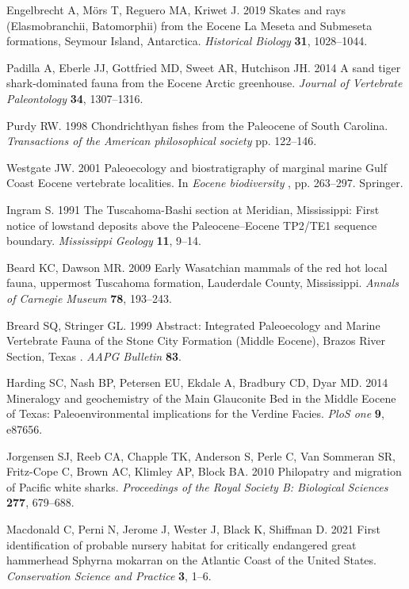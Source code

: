 \documentclass[]{rsos}%
\begin{document}
\begin{thebibliography}{99}
Engelbrecht A, M{\"{o}}rs T, Reguero MA, Kriwet J. 2019  {Skates and rays
  (Elasmobranchii, Batomorphii) from the Eocene La Meseta and Submeseta
  formations, Seymour Island, Antarctica}. {\em Historical Biology}
  \textbf{31}, 1028--1044.

Padilla A, Eberle JJ, Gottfried MD, Sweet AR, Hutchison JH. 2014  {A sand tiger
  shark-dominated fauna from the Eocene Arctic greenhouse}. {\em Journal of
  Vertebrate Paleontology} \textbf{34}, 1307--1316.

Purdy RW. 1998  Chondrichthyan fishes from the Paleocene of South Carolina.
  {\em Transactions of the American philosophical society} pp. 122--146.

Westgate JW. 2001  Paleoecology and biostratigraphy of marginal marine Gulf
  Coast Eocene vertebrate localities. In {\em Eocene biodiversity} ,  pp.
  263--297. Springer.

Ingram S. 1991  The Tuscahoma-Bashi section at Meridian, Mississippi: First
  notice of lowstand deposits above the Paleocene--Eocene TP2/TE1 sequence
  boundary. {\em Mississippi Geology} \textbf{11}, 9--14.

Beard KC, Dawson MR. 2009  Early Wasatchian mammals of the red hot local fauna,
  uppermost Tuscahoma formation, Lauderdale County, Mississippi. {\em Annals of
  Carnegie Museum} \textbf{78}, 193--243.

Breard SQ, Stringer GL. 1999  {Abstract: Integrated Paleoecology and Marine
  Vertebrate Fauna of the Stone City Formation (Middle Eocene), Brazos River
  Section, Texas }. {\em AAPG Bulletin} \textbf{83}.

Harding SC, Nash BP, Petersen EU, Ekdale A, Bradbury CD, Dyar MD. 2014
  Mineralogy and geochemistry of the Main Glauconite Bed in the Middle Eocene
  of Texas: Paleoenvironmental implications for the Verdine Facies. {\em PloS
  one} \textbf{9}, e87656.

Jorgensen SJ, Reeb CA, Chapple TK, Anderson S, Perle C, {Van Sommeran} SR,
  Fritz-Cope C, Brown AC, Klimley AP, Block BA. 2010  {Philopatry and migration
  of Pacific white sharks}. {\em Proceedings of the Royal Society B: Biological
  Sciences} \textbf{277}, 679--688.

Macdonald C, Perni N, Jerome J, Wester J, Black K, Shiffman D. 2021  {First
  identification of probable nursery habitat for critically endangered great
  hammerhead Sphyrna mokarran on the Atlantic Coast of the United States}. {\em
  Conservation Science and Practice} \textbf{3}, 1--6.


\end{thebibliography}
\end{document}
